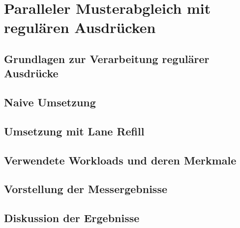 \chapter{Paralleler Musterabgleich mit regulären Ausdrücken}

\section{Grundlagen zur Verarbeitung regulärer Ausdrücke}

\section{Naive Umsetzung}

\section{Umsetzung mit Lane Refill}

\section{Verwendete Workloads und deren Merkmale}

\section{Vorstellung der Messergebnisse}

\section{Diskussion der Ergebnisse}
